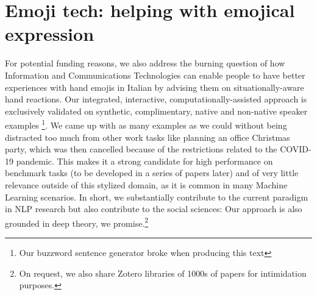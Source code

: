 \documentclass{article}
\begin{document}
\section{Emoji tech: helping with emojical expression}

For potential funding reasons, we also address the burning question of how Information and Communications Technologies can enable people to have better experiences with hand emojis in Italian by advising them on situationally-aware hand reactions. Our integrated, interactive, computationally-assisted approach is exclusively validated on synthetic, complimentary, native and non-native speaker examples \footnote{Our buzzword sentence generator broke when producing this text}. We came up with as many examples as we could  without being distracted too much from other work tasks like planning an office Christmas party, which was then cancelled because of the restrictions related to the COVID-19 pandemic. This makes it a strong candidate for high performance on benchmark tasks (to be developed in a series of papers later) and of very little relevance outside of this stylized domain, as it is common in many Machine Learning scenarios. In short, we substantially contribute to the current paradigm in NLP research but also contribute to the social sciences: Our approach is also grounded in deep theory, we promise.\footnote{On request, we also share Zotero libraries of 1000s of papers for intimidation purposes.}
\end{document}
